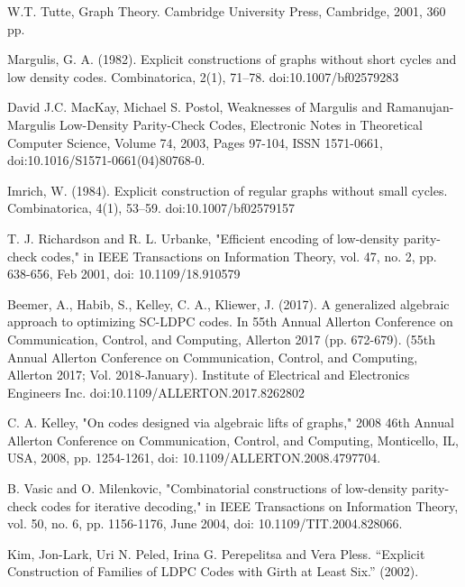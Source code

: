 \documentclass[leqno]{aadmbook}
\newcounter{definition}[section]
\begin{document}
\begin{thebibliography}{1}
W.T. Tutte, Graph Theory. Cambridge University Press, Cambridge, 2001, 360 pp.

Margulis, G. A. (1982). Explicit constructions of graphs without short cycles and low density codes. Combinatorica, 2(1), 71–78. 
doi:10.1007/bf02579283

David J.C. MacKay, Michael S. Postol, Weaknesses of Margulis and Ramanujan-Margulis Low-Density Parity-Check Codes, Electronic Notes in Theoretical Computer Science, Volume 74, 2003, Pages 97-104, ISSN 1571-0661, doi:10.1016/S1571-0661(04)80768-0.

Imrich, W. (1984). Explicit construction of regular graphs without small cycles. Combinatorica, 4(1), 53–59. doi:10.1007/bf02579157 

T. J. Richardson and R. L. Urbanke, "Efficient encoding of low-density parity-check codes," in IEEE Transactions on Information Theory, vol. 47, no. 2, pp. 638-656, Feb 2001, doi: 10.1109/18.910579

Beemer, A., Habib, S., Kelley, C. A., Kliewer, J. (2017). A generalized algebraic approach to optimizing SC-LDPC codes. In 55th Annual Allerton Conference on Communication, Control, and Computing, Allerton 2017 (pp. 672-679). (55th Annual Allerton Conference on Communication, Control, and Computing, Allerton 2017; Vol. 2018-January). Institute of Electrical and Electronics Engineers Inc. doi:10.1109/ALLERTON.2017.8262802


C. A. Kelley, "On codes designed via algebraic lifts of graphs," 2008 46th Annual Allerton Conference on Communication, Control, and Computing, Monticello, IL, USA, 2008, pp. 1254-1261, doi: 10.1109/ALLERTON.2008.4797704.


B. Vasic and O. Milenkovic, "Combinatorial constructions of low-density parity-check codes for iterative decoding," in IEEE Transactions on Information Theory, vol. 50, no. 6, pp. 1156-1176, June 2004, doi: 10.1109/TIT.2004.828066.

Kim, Jon-Lark, Uri N. Peled, Irina G. Perepelitsa and Vera Pless. “Explicit Construction of Families of LDPC Codes with Girth at Least Six.” (2002).

\end{thebibliography}
\end{document}
